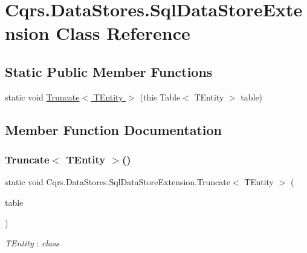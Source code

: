 \hypertarget{classCqrs_1_1DataStores_1_1SqlDataStoreExtension}{}\section{Cqrs.\+Data\+Stores.\+Sql\+Data\+Store\+Extension Class Reference}
\label{classCqrs_1_1DataStores_1_1SqlDataStoreExtension}
\subsection*{Static Public Member Functions}
\begin{DoxyCompactItemize}
\item 
static void \hyperlink{classCqrs_1_1DataStores_1_1SqlDataStoreExtension_a0647739ae3e2ba9b9e488231cc4601ba_a0647739ae3e2ba9b9e488231cc4601ba}{Truncate$<$ T\+Entity $>$} (this Table$<$ T\+Entity $>$ table)
\end{DoxyCompactItemize}


\subsection{Member Function Documentation}
\mbox{\label{classCqrs_1_1DataStores_1_1SqlDataStoreExtension_a0647739ae3e2ba9b9e488231cc4601ba_a0647739ae3e2ba9b9e488231cc4601ba}} 
\subsubsection{\texorpdfstring{Truncate$<$ T\+Entity $>$()}{Truncate< TEntity >()}}
{\footnotesize\ttfamily static void Cqrs.\+Data\+Stores.\+Sql\+Data\+Store\+Extension.\+Truncate$<$ T\+Entity $>$ (\begin{DoxyParamCaption}\item[{this Table$<$ T\+Entity $>$}]{table }\end{DoxyParamCaption})\hspace{0.3cm}{\ttfamily [static]}}

\begin{Desc}
\item[Type Constraints]\begin{description}
\item[{\em T\+Entity} : {\em class}]\end{description}
\end{Desc}
